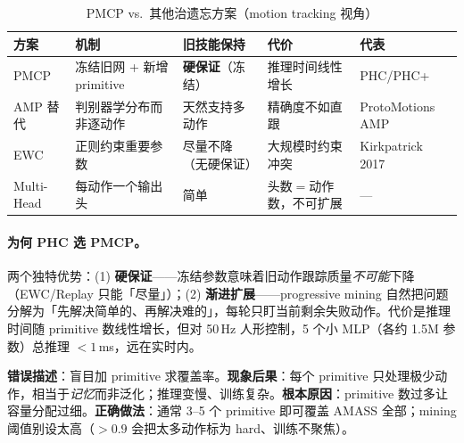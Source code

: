 
\begin{table}[ht]
\centering
\small
\caption{PMCP vs.\ 其他治遗忘方案（motion tracking 视角）}
\label{tab:rlmc-mi-forget}
\begin{tabular}{@{}lllll@{}}
\toprule
方案 & 机制 & 旧技能保持 & 代价 & 代表 \\
\midrule
PMCP & 冻结旧网 + 新增 primitive & \textbf{硬保证}（冻结） & 推理时间线性增长 & PHC/PHC+ \\
AMP 替代 & 判别器学分布而非逐动作 & 天然支持多动作 & 精确度不如直跟 & ProtoMotions AMP \\
EWC & 正则约束重要参数 & 尽量不降（无硬保证） & 大规模时约束冲突 & Kirkpatrick 2017 \\
Multi-Head & 每动作一个输出头 & 简单 & 头数$=$动作数，不可扩展 & --- \\
\bottomrule
\end{tabular}
\end{table}

\paragraph{为何 PHC 选 PMCP。}两个独特优势：(1) \textbf{硬保证}——冻结参数意味着旧动作跟踪质量\emph{不可能}下降（EWC/Replay 只能「尽量」）；(2) \textbf{渐进扩展}——progressive mining 自然把问题分解为「先解决简单的、再解决难的」，每轮只盯当前剩余失败动作。代价是推理时间随 primitive 数线性增长，但对 50\,Hz 人形控制，5 个小 MLP（各约 1.5M 参数）总推理 $<1$\,ms，远在实时内。

\begin{pitfall}
\textbf{错误描述}：盲目加 primitive 求覆盖率。\textbf{现象后果}：每个 primitive 只处理极少动作，相当于\emph{记忆}而非泛化；推理变慢、训练复杂。\textbf{根本原因}：primitive 数过多让容量分配过细。\textbf{正确做法}：通常 3--5 个 primitive 即可覆盖 AMASS 全部；mining 阈值别设太高（$>0.9$ 会把太多动作标为 hard、训练不聚焦）。
\end{pitfall}

